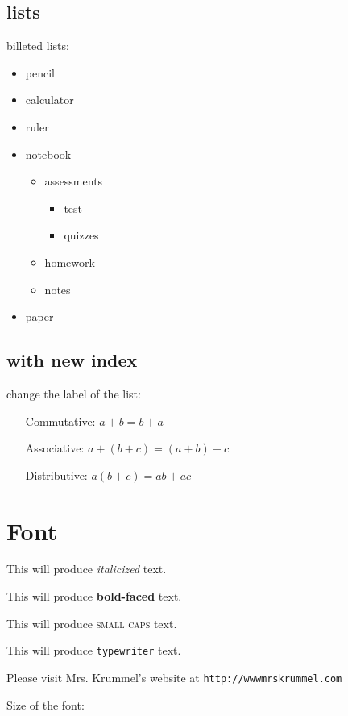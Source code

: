 \documentclass[11pt]{article}
\theoremstyle{definition}
\begin{document}
	\subsection{lists}
billeted lists: 
\begin{itemize}
	\item pencil
	\item calculator
	\item ruler
	\item notebook
		\begin{itemize}
			\item assessments
			\begin{itemize}
				\item test
				\item quizzes
			\end{itemize}
			\item homework
			\item notes
		\end{itemize}
	\item paper
\end{itemize}

	\subsection{with new index}
\begin{flushleft}
change the label of the list:
\end{flushleft}

\begin{enumerate}
\item[Commutative:] $a+b=b+a$
\item[Associative:] $a+(b+c)=(a+b)+c$
\item[Distributive: ] $a(b+c) = ab + ac$
\end{enumerate}


\section{Font}
This will produce  \textit{italicized} text.

This will produce  \textbf{bold-faced} text.

This will produce  \textsc{small caps} text.

This will produce  \texttt{typewriter} text.

Please visit Mrs. Krummel's website at \texttt{http://wwwmrskrummel.com}


\begin{flushleft}
Size of the font:
\end{flushleft}
\end{document}
